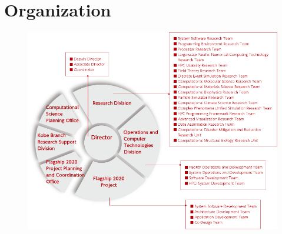 \chapter*{Organization}

\begin{figure}[h]
\centering
\includegraphics[width=\textwidth,keepaspectratio]{organization/organization-portrait.pdf}
\end{figure}
